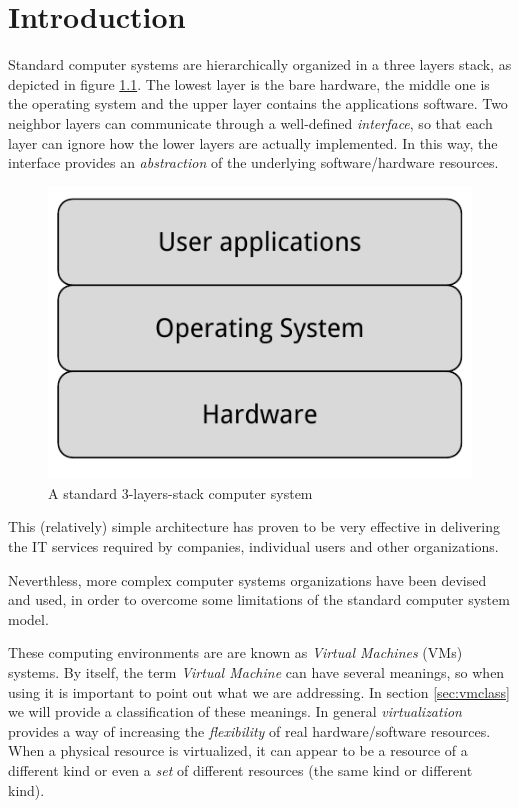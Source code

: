\chapter{Introduction}

Standard computer systems are hierarchically organized in a three
layers stack, as depicted in figure \ref{fig:3ls}. The lowest layer is the bare hardware, the middle one is the operating system and the 
upper layer contains the applications software.
Two neighbor layers can communicate through a well-defined \emph{interface}, so that each layer can ignore how the
lower layers are actually implemented. In this way, the interface provides an \emph{abstraction} of the underlying software/hardware
resources.

\begin{figure}[bt]
\centering
\includegraphics[scale = 1.0]{3-layers-stack.pdf}
\caption{A standard 3-layers-stack computer system}
\label{fig:3ls}
\end{figure}

This (relatively) simple architecture has proven to be very effective in delivering the IT services required
by companies, individual users and other organizations.

\vspace{0.5cm}

Neverthless, more complex computer systems organizations have been devised and used, in order to overcome some limitations
of the standard computer system model.

These computing environments are are known as \emph{Virtual Machines} (VMs) systems.
By itself, the term \emph{Virtual Machine} can have several meanings, so when using it is important to point out what we are
addressing. In section \ref{sec:vmclass} we will provide a classification of these meanings.
In general \emph{virtualization} provides a way of increasing the \emph{flexibility} of real hardware/software resources. When a 
physical resource is virtualized, it can appear to be a resource of a different kind or even a \emph{set} of different
resources (the same kind or different kind).

